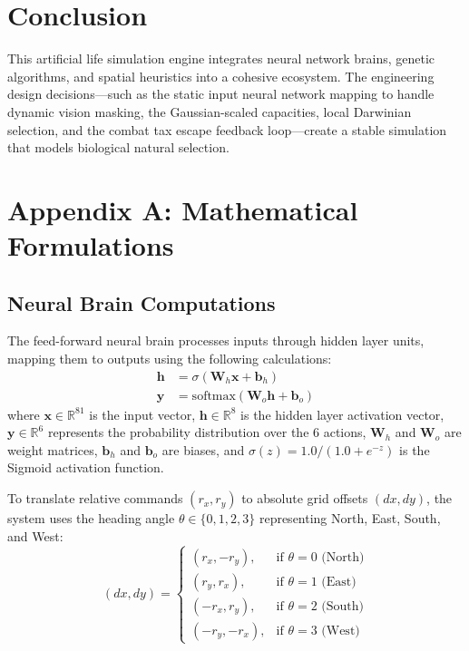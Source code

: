 \documentclass[11pt,a4paper]{article}
\begin{document}
\section{Conclusion}

This artificial life simulation engine integrates neural network brains, genetic algorithms, and spatial heuristics into a cohesive ecosystem. The engineering design decisions—such as the static input neural network mapping to handle dynamic vision masking, the Gaussian-scaled capacities, local Darwinian selection, and the combat tax escape feedback loop—create a stable simulation that models biological natural selection.

\newpage

\appendix

\section{Appendix A: Mathematical Formulations}

\subsection{Neural Brain Computations}
The feed-forward neural brain processes inputs through hidden layer units, mapping them to outputs using the following calculations:
\begin{align}
    \mathbf{h} &= \sigma(\mathbf{W}_h \mathbf{x} + \mathbf{b}_h) \\
    \mathbf{y} &= \text{softmax}(\mathbf{W}_o \mathbf{h} + \mathbf{b}_o)
\end{align}
where $\mathbf{x} \in \mathbb{R}^{81}$ is the input vector, $\mathbf{h} \in \mathbb{R}^8$ is the hidden layer activation vector, $\mathbf{y} \in \mathbb{R}^6$ represents the probability distribution over the 6 actions, $\mathbf{W}_h$ and $\mathbf{W}_o$ are weight matrices, $\mathbf{b}_h$ and $\mathbf{b}_o$ are biases, and $\sigma(z) = 1.0 / (1.0 + e^{-z})$ is the Sigmoid activation function.

To translate relative commands $(r_x, r_y)$ to absolute grid offsets $(dx, dy)$, the system uses the heading angle $\theta \in \{0, 1, 2, 3\}$ representing North, East, South, and West:
\begin{equation}
    (dx, dy) = \begin{cases}
        (r_x, -r_y), & \text{if } \theta = 0\text{ (North)} \\
        (r_y, r_x), & \text{if } \theta = 1\text{ (East)} \\
        (-r_x, r_y), & \text{if } \theta = 2\text{ (South)} \\
        (-r_y, -r_x), & \text{if } \theta = 3\text{ (West)}
    \end{cases}
\end{equation}
\end{document}
